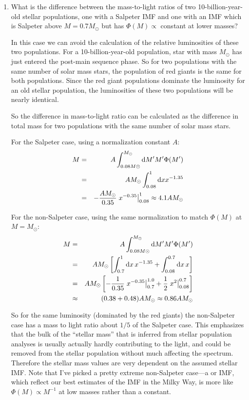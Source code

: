 \begin{enumerate}
\item What is the difference between the mass-to-light ratios of two
10-billion-year-old stellar populations, one with a Salpeter IMF and
one with an IMF which is Salpeter above $M=0.7M_\odot$ but has
$\Phi(M) \propto$ constant at lower masses?

\begin{answer}
In this case we can avoid the calculation of the relative luminosities
of these two populations. For a 10-billion-year-old population, star
with mass $M_\odot$ has just entered the post-main sequence phase. So
for two populations with the same number of solar mass stars, the
population of red giants is the same for both populations. Since the
red giant populations dominate the luminosity for an old stellar
population, the luminosities of these two populations will be nearly
identical.

So the difference in mass-to-light ratio can be calculated as the
difference in total mass for two populations with the same number of
solar mass stars. 

For the Salpeter case, using a normalization constant $A$:
\begin{eqnarray}
M &=& A\int_{0.08M\odot}^{M_\odot} {\rm d}M' M' \Phi(M') \cr
&=& A M_\odot \int_{0.08}^{1} {\rm d}x x^{-1.35} \cr
&=& - \frac{A M_\odot}{0.35} \left.
x^{-0.35} \right|_{0.08}^{1} \approx 4.1 A M_\odot
\end{eqnarray}

For the non-Salpeter case, using the same normalization to match
$\Phi(M)$ at $M=M_\odot$: 
\begin{eqnarray}
M &=& A\int_{0.08M\odot}^{M_\odot} {\rm d}M' M' \Phi(M') \cr
&=& A M_\odot \left[ \int_{0.7}^{1} {\rm d}x\, x^{-1.35} +
\int_{0.08}^{0.7} {\rm d}x\, x\right]\cr
&=& A M_\odot \left[
- \frac{1}{0.35} \left. x^{-0.35} \right|_{0.7}^{1.0}
+ \frac{1}{2} \left. x^2 \right|_{0.08}^{0.7}\right]\cr
&\approx& (0.38 + 0.48) AM_\odot \approx 0.86  A M_\odot
\end{eqnarray}

So for the same luminosity (dominated by the red giants) the
non-Salpeter case has a mass to light ratio about $1/5$ of the
Salpeter case. This emphasizes that the bulk of the ``stellar mass''
that is inferred from stellar population analyses is usually actually
hardly contributing to the light, and could be removed from the
stellar population without much affecting the spectrum. Therefore the
stellar mass values are very dependent on the assumed stellar
IMF. Note that I've picked a pretty extreme non-Salpeter
case---a \citet{kroupa01a} or \citet{chabrier03a} IMF, which reflect
our best estimates of the IMF in the Milky Way, is more like
$\Phi(M) \propto M^{-1}$ at low masses rather than a constant.
\end{answer}
\end{enumerate} 

